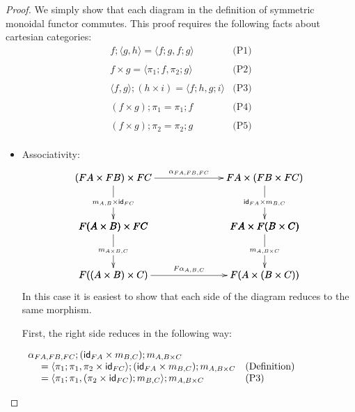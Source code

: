 \iffalse
\begin{proof}
  We simply show that each diagram in the definition of symmetric
  monoidal functor commutes.  This proof requires the following facts
  about cartesian categories:
  \[
  \begin{array}{lll}
    f;\langle g , h \rangle = \langle f;g, f;g \rangle & \text{(P1)}\\
    \\
    f \times g = \langle \pi_1;f , \pi_2;g \rangle & \text{(P2)}\\
    \\
    \langle f , g \rangle;(h \times i) = \langle f;h, g;i \rangle & \text{(P3)}\\
    \\
    (f \times g);\pi_1 = \pi_1;f & \text{(P4)}\\
    \\
    (f \times g);\pi_2 = \pi_2;g & \text{(P5)}\\
  \end{array}
  \]
  \begin{itemize}
  \item[] Associativity:\ \\
    \[
    \bfig
    \vSquares|ammmmma|/->`->`->``->`->`->/[
      (FA \times FB) \times FC`
      FA \times (FB \times FC)`
      F(A \times B) \times FC`
      FA \times F(B \times C)`
      F((A \times B) \times C)`
      F(A \times (B \times C));
      {\alpha}_{FA,FB,FC}`
      m_{A,B} \times \id_{FC}`
      \id_{FA} \times m_{B,C}``
      m_{A \times B,C}`
      m_{A,B \times C}`
      F{\alpha}_{A,B,C}]
    \efig
    \]
    In this case it is easiest to show that each side of the diagram
    reduces to the same morphism.

    First, the right side reduces in the following way:
    \begin{center}
      \begin{math}
        \begin{array}{lll}
          \alpha_{FA,FB,FC};(\mathsf{id}_{FA} \times m_{B,C});m_{A,B \times C} \\
          \,\,\,\,\,\,\,\,= \langle \pi_1;\pi_1, \pi_2 \times \mathsf{id}_{FC} \rangle;(\mathsf{id}_{FA} \times m_{B,C});m_{A,B \times C} & \text{(Definition)}\\
          \,\,\,\,\,\,\,\,= \langle \pi_1;\pi_1, (\pi_2 \times \mathsf{id}_{FC});m_{B,C} \rangle;m_{A,B \times C} & \text{(P3)}\\
        \end{array}
      \end{math}
    \end{center}


\end{itemize}
\end{proof}
